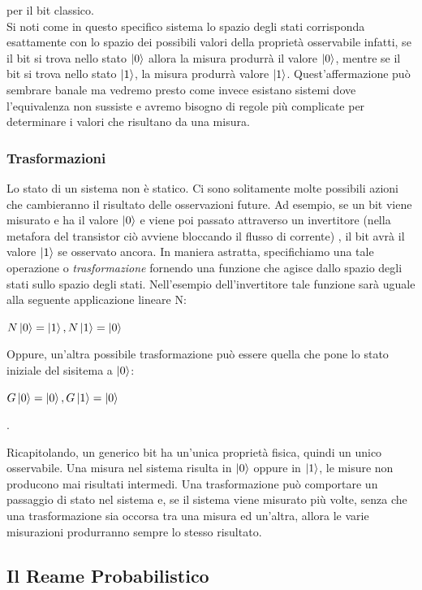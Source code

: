 \documentclass[12pt,a4paper,openright]{report}
\begin{document}
per il bit classico.\\
Si noti come in questo specifico sistema lo spazio degli stati corrisponda esattamente con lo spazio dei possibili valori della proprietà
osservabile infatti, se il bit si trova nello stato $\ket0$ allora la misura produrrà il valore $\ket0$, mentre se il bit si trova nello stato $\ket1$,
la misura produrrà valore $\ket1$. Quest'affermazione può sembrare banale ma vedremo presto come invece esistano sistemi dove l'equivalenza 
non sussiste e avremo bisogno di regole più complicate per determinare i valori che risultano da una misura. 

\subsubsection{Trasformazioni}
Lo stato di un sistema non è statico. Ci sono solitamente molte possibili azioni che cambieranno il risultato delle osservazioni future. Ad esempio,
se un bit viene misurato e ha il valore $\ket0$ e viene poi passato attraverso un invertitore (nella metafora del transistor ciò avviene bloccando il flusso di corrente)
, il bit avrà il valore $\ket1$ se osservato ancora. In maniera astratta, specifichiamo una tale operazione o \emph{trasformazione} fornendo una funzione che
agisce dallo spazio degli stati sullo spazio degli stati. Nell'esempio dell'invertitore tale funzione sarà uguale alla seguente applicazione lineare N:
\begin{center}
    $ N\ket0 = \ket1, N\ket1 = \ket0 $
\end{center}
Oppure, un'altra possibile trasformazione può essere quella che pone lo stato iniziale del sisitema a $\ket0$:
\begin{center}
    $G\ket0 = \ket0,  G\ket1 = \ket0$
\end{center}.
\par
Ricapitolando, un generico bit ha un'unica proprietà fisica, quindi un unico osservabile. Una misura nel sistema risulta in $\ket0$ oppure in $\ket1$, le 
misure non producono mai risultati intermedi. Una trasformazione può comportare un passaggio di stato nel sistema e, se il sistema viene misurato più volte,
 senza che una trasformazione sia occorsa tra una misura ed un'altra, allora le varie misurazioni produrranno sempre lo stesso risultato.

\subsection{Il Reame Probabilistico}
\end{document}
